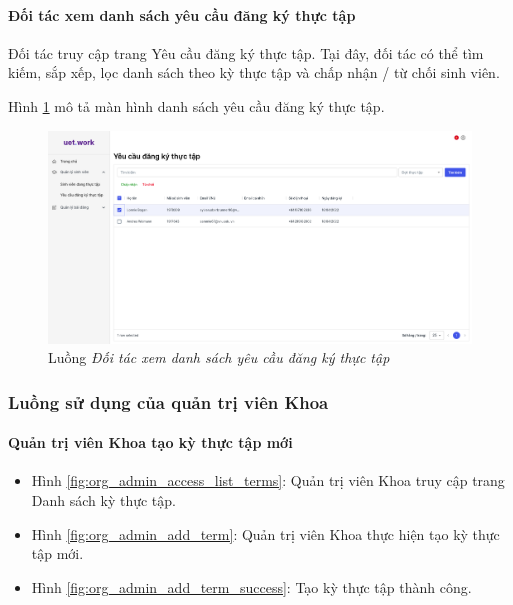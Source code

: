 \documentclass[./../main.tex]{subfiles}
\begin{document}
\paragraph*{Đối tác xem danh sách yêu cầu đăng ký thực tập}

Đối tác truy cập trang Yêu cầu đăng ký thực tập. Tại đây, đối tác có thể tìm kiếm, sắp xếp, lọc danh sách theo kỳ thực tập và chấp nhận / từ chối sinh viên.

Hình \ref{fig:partner_view_list_requests_page} mô tả màn hình danh sách yêu cầu đăng ký thực tập.

\begin{figure}[]
	\includegraphics[width=\linewidth]{./images/image29.png}
	\caption{Luồng \emph{Đối tác xem danh sách yêu cầu đăng ký thực tập}}
	\label{fig:partner_view_list_requests_page}
\end{figure}

\subsubsection{Luồng sử dụng của quản trị viên Khoa}

\paragraph*{Quản trị viên Khoa tạo kỳ thực tập mới}

\begin{itemize}
	\item Hình \ref{fig:org_admin_access_list_terms}: Quản trị viên Khoa truy cập trang Danh sách kỳ thực tập.
	\item Hình \ref{fig:org_admin_add_term}: Quản trị viên Khoa thực hiện tạo kỳ thực tập mới.
	\item Hình \ref{fig:org_admin_add_term_success}: Tạo kỳ thực tập thành công.
\end{itemize}
\end{document}
